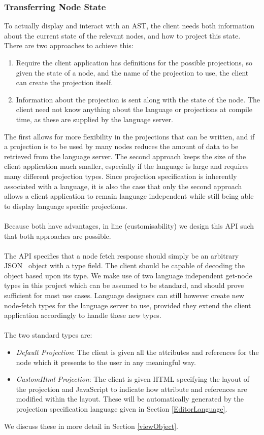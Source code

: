 \documentclass{article}
\begin{document}
{\subsubsection{Transferring Node State}\label{apiNodeStateTransfer}
To actually display and interact with an AST, the client needs both information about the current state of the relevant nodes, and how to project this state. There are two approaches to achieve this:
\begin{enumerate}
\item Require the client application has definitions for the possible projections, so given the state of a node, and the name of the projection to use, the client can create the projection itself.
\item Information about the projection is sent along with the state of the node. The client need not know anything about the language or projections at compile time, as these are supplied by the language server.
\end{enumerate}
The first allows for more flexibility in the projections that can be written, and if a projection is to be used by many nodes reduces the amount of data to be retrieved from the language server. The second approach keeps the size of the client application much smaller, especially if the language is large and requires many different projection types. Since projection specification is inherently associated with a language, it is also the case that only the second approach allows a client application to remain language independent while still being able to display language specific projections.
\\
\\
Because both have advantages, in line \RCustom (customisability) we design this API such that both approaches are possible.
\\
\\
The API specifies that a node fetch response should simply be an arbitrary JSON~\cite{json} object with a type field. The client should be capable of decoding the object based upon its type. We make use of two language independent get-node types in this project which can be assumed to be standard, and should prove sufficient for most use cases. Language designers can still however create new node-fetch types for the language server to use, provided they extend the client application accordingly to handle these new types. 
\\
\\
The two standard types are:
\begin{itemize}
\item \emph{Default Projection}: The client is given all the attributes and references for the node which it presents to the user in any meaningful way.
\item \emph{CustomHtml Projection}: The client is given HTML specifying the layout of the projection and JavaScript to indicate how attribute and references are modified within the layout. These will be automatically generated by the projection specification language given in Section \ref{EditorLanguage}.
\end{itemize}
We discuss these in more detail in Section \ref{viewObject}.
}
\end{document}
